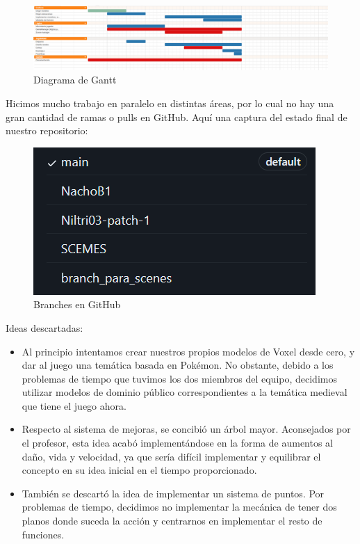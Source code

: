 \documentclass{article}
\begin{document}
    \begin{figure}[h!]
        \centering
        \includegraphics[width=\textwidth]{img/8.png}
        \caption{Diagrama de Gantt}
    \end{figure}

    Hicimos mucho trabajo en paralelo en distintas áreas, por lo cual no hay una gran cantidad de ramas o pulls en GitHub. 
    Aquí una captura del estado final de nuestro repositorio:
    \begin{figure}[h!]
        \centering
        \includegraphics[width=\textwidth]{img/9.png}
        \caption{Branches en GitHub}
    \end{figure}

    Ideas descartadas:

    \begin{itemize}
        \item Al principio intentamos crear nuestros propios modelos de Voxel desde cero, y dar al juego una temática basada en Pokémon. 
                No obstante, debido a los problemas de tiempo que tuvimos los dos miembros del equipo, decidimos utilizar modelos de dominio público correspondientes a la temática medieval que tiene el juego ahora. 
        \item Respecto al sistema de mejoras, se concibió un árbol mayor. 
                Aconsejados por el profesor, esta idea acabó implementándose en la forma de aumentos al daño, vida y velocidad, ya que sería difícil implementar y equilibrar el concepto en su idea inicial en el tiempo proporcionado.
    
        \item También se descartó la idea de implementar un sistema de puntos.  
                Por problemas de tiempo, decidimos no implementar la mecánica de tener dos planos donde suceda la acción y centrarnos en implementar el resto de funciones.
    \end{itemize} 
\end{document}
